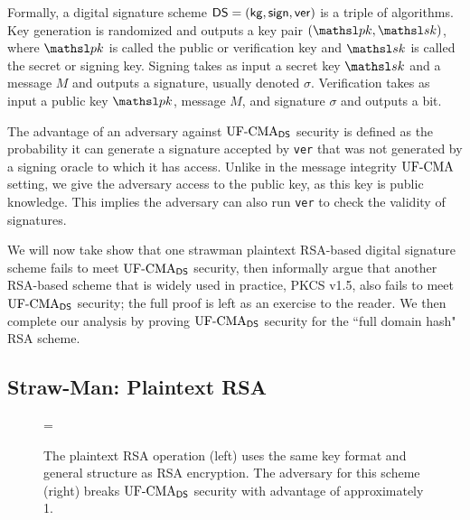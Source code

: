 Formally, a digital signature scheme ${\mathsf{DS}} = ({\sf kg},{\mathsf{sign}},\mathsf{ver})$ is a triple of
algorithms. Key generation is randomized and outputs a key pair $(\pk,\sk)$,
where $\pk$ is called the public or verification key and $\sk$ is called the secret or
signing key.
Signing takes as input a secret key $\sk$ and a message $M$ and outputs a
signature, usually denoted $\sigma$.
Verification takes as input a public key $\pk$, message $M$, and signature
$\sigma$ and outputs a
bit.

The advantage of an adversary against $\textnormal{UF-CMA}_{{\mathsf{DS}}}$ security is defined as the probability it can generate a signature accepted by \texttt{ver} that was not generated by a signing oracle to which it has access.  Unlike in the message integrity $\textnormal{UF-CMA}$ setting, we give the adversary access to the public key, as this key is public knowledge.  This implies the adversary can also run \texttt{ver} to check the validity of signatures.

We will now take show that one strawman plaintext RSA-based digital signature scheme fails to meet $\textnormal{UF-CMA}_{{\mathsf{DS}}}$ security, then informally argue that another RSA-based scheme that is widely used in practice, PKCS v1.5, also fails to meet $\textnormal{UF-CMA}_{{\mathsf{DS}}}$ security; the full proof is left as an exercise to the reader.  We then complete our analysis by proving $\textnormal{UF-CMA}_{{\mathsf{DS}}}$ security for the ``full domain hash" RSA scheme.

\subsection{Straw-Man: Plaintext RSA}


\begin{figure}[h]
\centering
{}
\bnm
  \AdvUFCMA{\DS}{\advA^\SignOracle} = \Prob{\UFCMA_{\DS}^{\advA^\SignOracle}\Rightarrow\true} 
\enm

  \caption{The plaintext RSA operation (left) uses the same key format and general structure as RSA encryption.  The adversary for this scheme (right) breaks $\textnormal{UF-CMA}_{{\mathsf{DS}}}$ security with advantage of approximately 1.}
\label{fig:plaintextrsa}
\end{figure}

